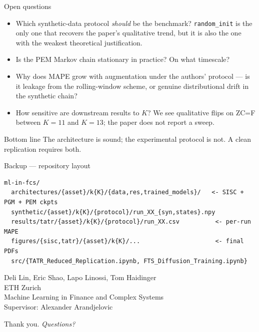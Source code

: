 \documentclass[11pt,aspectratio=169]{beamer}
\begin{document}
\begin{frame}{Open questions}
  \begin{itemize}\setlength\itemsep{4pt}
    \item Which synthetic-data protocol \emph{should} be the benchmark?
      \texttt{random\_init} is the only one that recovers the paper's qualitative trend, but it is also the one with the weakest theoretical justification.
    \item Is the PEM Markov chain stationary in practice? On what timescale?
    \item Why does MAPE grow with augmentation under the authors' protocol --- is it leakage from the rolling-window scheme, or genuine distributional drift in the synthetic chain?
    \item How sensitive are downstream results to $K$? We see qualitative flips on ZC=F between $K\!=\!11$ and $K\!=\!13$; the paper does not report a sweep.
  \end{itemize}
  \begin{exampleblock}{Bottom line}
    The architecture is sound; the experimental protocol is not.
    A clean replication requires both.
  \end{exampleblock}
\end{frame}

\begin{frame}[fragile]{Backup --- repository layout}
  \footnotesize
\begin{verbatim}
ml-in-fcs/
  architectures/{asset}/k{K}/{data,res,trained_models}/   <- SISC + PGM + PEM ckpts
  synthetic/{asset}/k{K}/{protocol}/run_XX_{syn,states}.npy
  results/tatr/{asset}/k{K}/{protocol}/run_XX.csv          <- per-run MAPE
  figures/{sisc,tatr}/{asset}/k{K}/...                     <- final PDFs
  src/{TATR_Reduced_Replication.ipynb, FTS_Diffusion_Training.ipynb}
\end{verbatim}
\end{frame}

\begin{closingframe}

Deli Lin, Eric Shao, Lapo Linossi, Tom Haidinger\\
\medskip
ETH Zurich\\
Machine Learning in Finance and Complex Systems\\
Supervisor: Alexander Arandjelovic

\medskip

Thank you. \emph{Questions?}

\end{closingframe}
\end{document}
